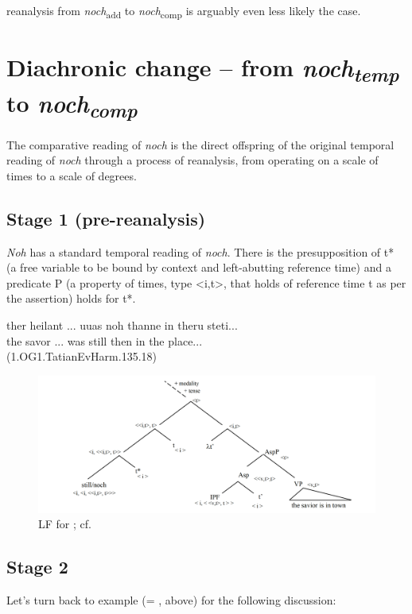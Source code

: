 \documentclass[output=paper,
modfonts
]{langscibook}
\begin{document}
reanalysis from \textit{noch}\textsubscript{add} to \textit{noch}\textsubscript{comp} is arguably even less likely the case.



\section{Diachronic change -- from \textit{noch\textsubscript{temp}} to \textit{noch\textsubscript{comp}}}\label{sec_diachr_analysis}

The comparative reading of \textit{noch} is the direct offspring of the original temporal reading of \textit{noch} through a process of reanalysis, from operating on a scale of times to a scale of degrees.

\subsection{Stage 1 (pre-reanalysis)} \textit{Noh} has a standard temporal reading of \textit{noch}. There is the presupposition of t* (a free variable to be bound by context and left-abutting reference time) and a predicate P (a property of times, type <i,t>, that holds of reference time t as per the assertion) holds for t*.

\ea\gll ther heilant ... uuas noh thanne in theru steti...\\
       the savor ... was still then in the place...\\
(1.OG1.TatianEvHarm.135.18)\label{TEMP_jesus_noch_in_town}
\z

\begin{figure}
\includegraphics[width=1\textwidth]{figures/LF0_temp}
\caption{LF for ; cf. \citep{beck2016a_sub}}
\label{fig:LF_TEMP_jesus_noch_in_town}
\end{figure}

\subsection{Stage 2} Let's turn back to example  (= , above) for the following discussion:
\end{document}
